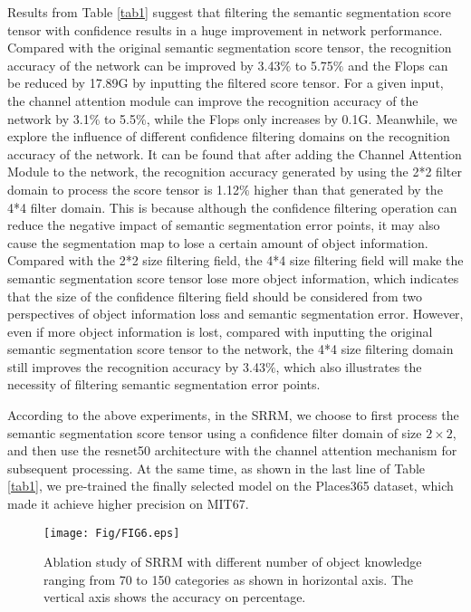 \documentclass[conference]{IEEEtran}
\begin{document}
Results from Table \ref{tab1} suggest that filtering the semantic segmentation score tensor with confidence results in a huge improvement in network performance. Compared with the original semantic segmentation score tensor, the recognition accuracy of the network can be improved by 3.43$\%$ to 5.75$\%$ and the Flops can be reduced by 17.89G by inputting the filtered score tensor. For a given input, the channel attention module can improve the recognition accuracy of the network by 3.1$\%$ to 5.5$\%$, while the Flops only increases by 0.1G.
Meanwhile, we explore the influence of different confidence filtering domains on the recognition accuracy of the network. It can be found that after adding the Channel Attention Module to the network, the recognition accuracy generated by using the 2*2 filter domain to process the score tensor is 1.12$\%$ higher than that generated by the 4*4 filter domain. This is because although the confidence filtering operation can reduce the negative impact of semantic segmentation error points, it may also cause the segmentation map to lose a certain amount of object information. Compared with the 2*2 size filtering field, the 4*4 size filtering field will make the semantic segmentation score tensor lose more object information, which indicates that the size of the confidence filtering field should be considered from two perspectives of object information loss and semantic segmentation error. However, even if more object information is lost, compared with inputting the original semantic segmentation score tensor to the network, the 4*4 size filtering domain still improves the recognition accuracy by 3.43$\%$, which also illustrates the necessity of filtering semantic segmentation error points.

According to the above experiments, in the SRRM, we choose to first process the semantic segmentation score tensor using a confidence filter domain of size $2 \times 2$, and then use the resnet50 architecture with the channel attention mechanism for subsequent processing. At the same time, as shown in the last line of Table \ref{tab1}, we pre-trained the finally selected model on the Places365 dataset, which made it achieve higher precision on MIT67.

\begin{figure}[htbp]
    \centering
    \texttt{[image: Fig/FIG6.eps]}
    \caption{Ablation study of SRRM with different number of object knowledge ranging from 70 to 150 categories as shown in horizontal axis. The vertical axis shows the accuracy on percentage.}
    \label{Fig6}
\end{figure}
\end{document}

